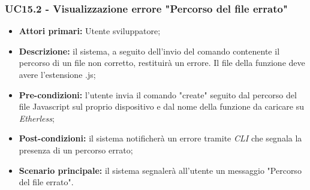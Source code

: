 \subsubsection{UC15.2 - Visualizzazione errore "Percorso del file errato"}
\begin{itemize}
	\item \textbf{Attori primari:} Utente sviluppatore;
	\item \textbf{Descrizione:} il sistema, a seguito dell'invio del comando contenente il percorso di un file non corretto, restituirà un errore. Il file della funzione deve avere l'estensione .js;
	\item \textbf{Pre-condizioni:}  l'utente invia il comando "create" seguito dal percorso del file Javascript sul proprio dispositivo e dal nome della funzione da caricare su \textit{Etherless};
	\item \textbf{Post-condizioni:} il sistema notificherà un errore tramite \textit{CLI\glo} che segnala la presenza di un percorso errato;
	\item \textbf{Scenario principale:} il sistema segnalerà all'utente un messaggio "Percorso del file errato".
\end{itemize}